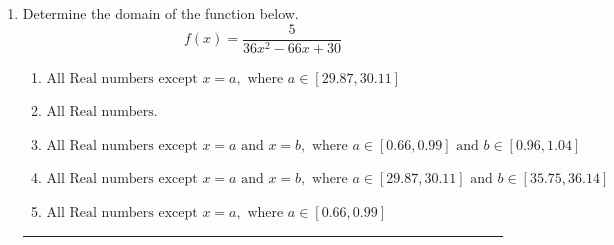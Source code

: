 \documentclass[14pt]{extbook}
\newcommand{\litem}[1]{\item#1\hspace*{-1cm}\rule{\textwidth}{0.4pt}}
\begin{document}
\begin{enumerate}
\litem{
Determine the domain of the function below.\[ f(x) = \frac{5}{36x^{2} -66 x + 30} \]\begin{enumerate}[label=\Alph*.]
\item \( \text{All Real numbers except } x = a, \text{ where } a \in [29.87, 30.11] \)
\item \( \text{All Real numbers.} \)
\item \( \text{All Real numbers except } x = a \text{ and } x = b, \text{ where } a \in [0.66, 0.99] \text{ and } b \in [0.96, 1.04] \)
\item \( \text{All Real numbers except } x = a \text{ and } x = b, \text{ where } a \in [29.87, 30.11] \text{ and } b \in [35.75, 36.14] \)
\item \( \text{All Real numbers except } x = a, \text{ where } a \in [0.66, 0.99] \)


\end{enumerate}}
\end{enumerate}
\end{document}
